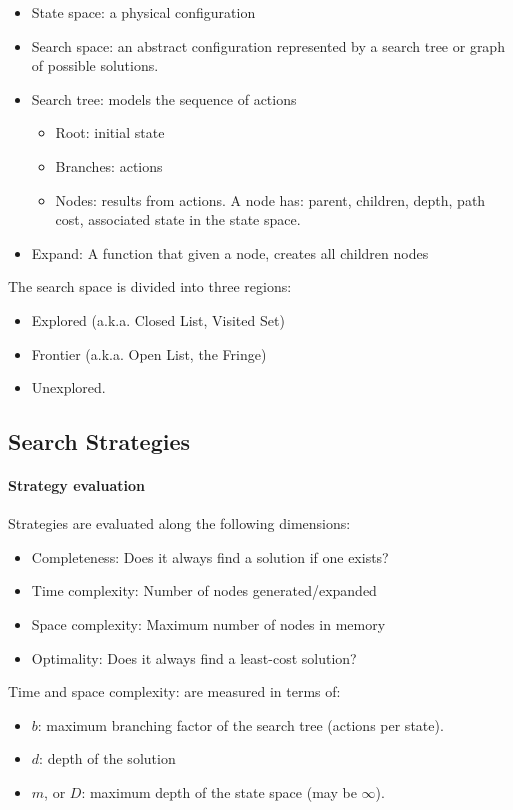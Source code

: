 \begin{itemize}
  \item State space: a physical configuration
  \item Search space: an abstract configuration represented by a search tree or graph of possible solutions.
  \item Search tree: models the sequence of actions
    \begin{itemize}
      \item Root: initial state
      \item Branches: actions
      \item Nodes: results from actions. A node has: parent, children, depth, path cost, associated state in the state space.
    \end{itemize}
  \item Expand: A function that given a node, creates all children nodes
\end{itemize}

The search space is divided into three regions:
\begin{itemize}
  \item Explored (a.k.a. Closed List, Visited Set)
  \item Frontier (a.k.a. Open List, the Fringe)
  \item Unexplored.
\end{itemize}

\subsection{Search Strategies}

\paragraph{Strategy evaluation} Strategies are evaluated along
the following dimensions:
\begin{itemize}
  \item Completeness: Does it always find a solution if one
    exists?
  \item Time complexity: Number of nodes generated/expanded
  \item Space complexity: Maximum number of nodes in memory
  \item Optimality: Does it always find a least-cost solution?
\end{itemize}

Time and space complexity: are measured in terms of:
\begin{itemize}
  \item $b$: maximum branching factor of the search tree (actions
    per state).
  \item $d$: depth of the solution
  \item $m$, or $D$: maximum depth of the state space (may be
    $\infty$).
\end{itemize}
